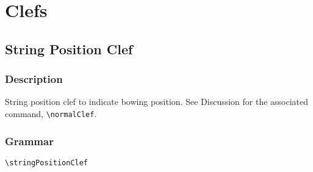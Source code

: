 

\chapter {Clefs}

\label{sec:stringPositionClef}
\section {String Position Clef}
\hfill
{}
\hfill

\subsection{Description}
String position clef to indicate bowing position. See Discussion for the associated command, \verb|\normalClef|.

\subsection{Grammar}
\begin{verbatim}
\stringPositionClef 
\end{verbatim}
